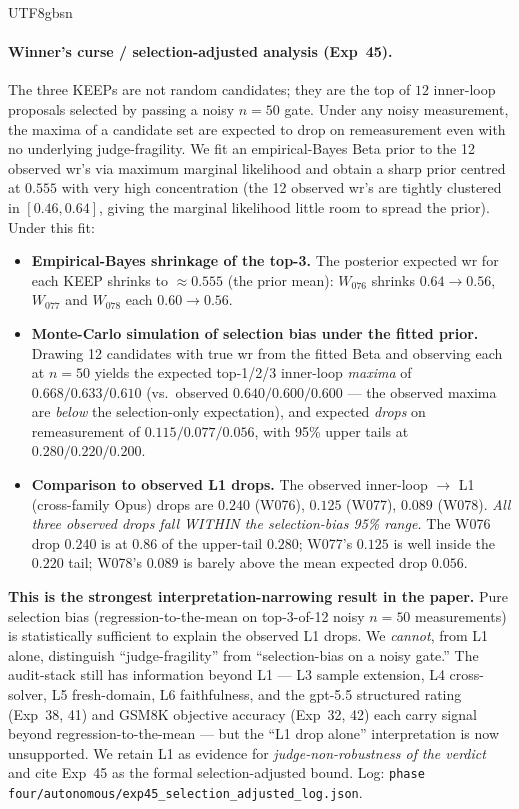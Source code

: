 \documentclass{article}
\begin{document}
\begin{CJK*}{UTF8}{gbsn}
\paragraph{Winner's curse / selection-adjusted analysis (Exp~45).}
The three KEEPs are not random candidates; they are the top of
\(12\) inner-loop proposals selected by passing a noisy \(n = 50\)
gate. Under any noisy measurement, the maxima of a candidate set
are expected to drop on remeasurement even with no underlying
judge-fragility. We fit an empirical-Bayes Beta prior to the 12
observed wr's via maximum marginal likelihood and obtain a sharp
prior centred at \(0.555\) with very high concentration (the 12
observed wr's are tightly clustered in \([0.46, 0.64]\), giving
the marginal likelihood little room to spread the prior). Under
this fit:

\begin{itemize}[leftmargin=*,topsep=2pt,itemsep=2pt]
  \item \textbf{Empirical-Bayes shrinkage of the top-3.} The
    posterior expected wr for each KEEP shrinks to \(\approx
    0.555\) (the prior mean): \(W_{076}\) shrinks
    \(0.64 \to 0.56\), \(W_{077}\) and \(W_{078}\) each
    \(0.60 \to 0.56\).
  \item \textbf{Monte-Carlo simulation of selection bias under
    the fitted prior.} Drawing 12 candidates with true wr from
    the fitted Beta and observing each at \(n=50\) yields the
    expected top-1/2/3 inner-loop \emph{maxima} of
    \(0.668 / 0.633 / 0.610\) (vs.\ observed \(0.640 / 0.600 /
    0.600\) --- the observed maxima are \emph{below} the
    selection-only expectation), and expected \emph{drops} on
    remeasurement of \(0.115 / 0.077 / 0.056\), with 95\% upper
    tails at \(0.280 / 0.220 / 0.200\).
  \item \textbf{Comparison to observed L1 drops.} The observed
    inner-loop \(\to\) L1 (cross-family Opus) drops are
    \(0.240\) (W076), \(0.125\) (W077), \(0.089\) (W078).
    \emph{All three observed drops fall WITHIN the
    selection-bias 95\% range.} The W076 drop \(0.240\) is at
    \(0.86\) of the upper-tail \(0.280\); W077's \(0.125\) is
    well inside the \(0.220\) tail; W078's \(0.089\) is barely
    above the mean expected drop \(0.056\).
\end{itemize}

\textbf{This is the strongest interpretation-narrowing result in
the paper.} Pure selection bias (regression-to-the-mean on
top-3-of-12 noisy \(n=50\) measurements) is statistically
sufficient to explain the observed L1 drops. We \emph{cannot},
from L1 alone, distinguish ``judge-fragility'' from
``selection-bias on a noisy gate.'' The audit-stack still has
information beyond L1 --- L3 sample extension, L4 cross-solver,
L5 fresh-domain, L6 faithfulness, and the gpt-5.5 structured
rating (Exp~38, 41) and GSM8K objective accuracy (Exp~32, 42)
each carry signal beyond regression-to-the-mean --- but the
``L1 drop alone'' interpretation is now unsupported. We retain
L1 as evidence for \emph{judge-non-robustness of the verdict}
and cite Exp~45 as the formal selection-adjusted bound. Log:
\texttt{phase four/autonomous/exp45\_selection\_adjusted\_log.json}.


\end{CJK*}
\end{document}
